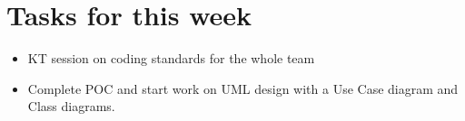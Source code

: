 \documentclass[11pt]{article} %
\begin{document}
\section{Tasks for this week}
\begin{itemize}
	\item KT session on coding standards for the whole team
	\item Complete POC and start work on UML design with a Use Case diagram and Class diagrams.
\end{itemize}

%
%
%
\end{document}
